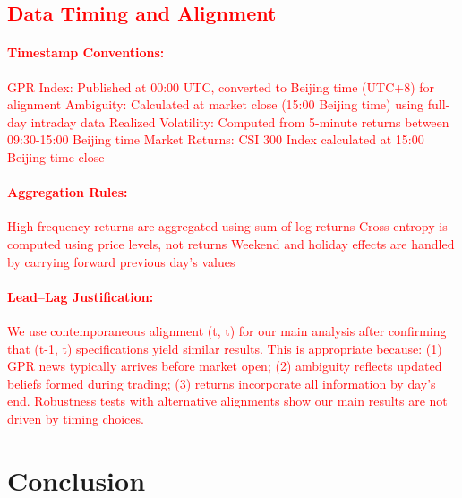 \documentclass[preprint,12pt,authoryear]{elsarticle}
\begin{document}
\textcolor{red}{\subsection{Data Timing and Alignment}}
\textcolor{red}{\paragraph{Timestamp Conventions:}}
\textcolor{red}{GPR Index: Published at 00:00 UTC, converted to Beijing time (UTC+8) for alignment}
\textcolor{red}{Ambiguity: Calculated at market close (15:00 Beijing time) using full-day intraday data}
\textcolor{red}{Realized Volatility: Computed from 5-minute returns between 09:30-15:00 Beijing time}
\textcolor{red}{Market Returns: CSI 300 Index calculated at 15:00 Beijing time close}
\textcolor{red}{}
\textcolor{red}{\paragraph{Aggregation Rules:}}
\textcolor{red}{High-frequency returns are aggregated using sum of log returns}
\textcolor{red}{Cross-entropy is computed using price levels, not returns}
\textcolor{red}{Weekend and holiday effects are handled by carrying forward previous day's values}
\textcolor{red}{}
\textcolor{red}{\paragraph{Lead--Lag Justification:}}
\textcolor{red}{We use contemporaneous alignment (t, t) for our main analysis after confirming that (t-1, t) specifications yield similar results. This is appropriate because: (1) GPR news typically arrives before market open; (2) ambiguity reflects updated beliefs formed during trading; (3) returns incorporate all information by day's end. Robustness tests with alternative alignments show our main results are not driven by timing choices.}

\section{Conclusion}
\label{sec:conclusion}
\end{document}
